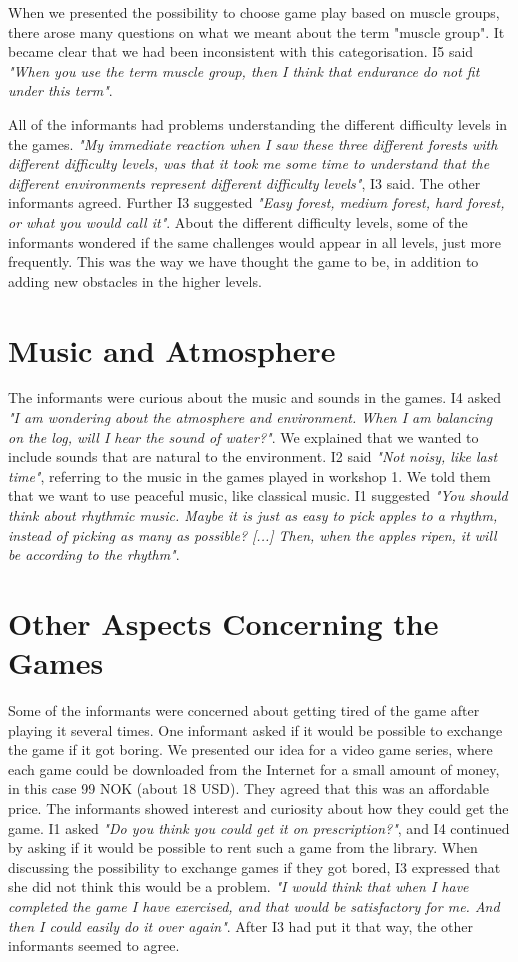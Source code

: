 When we presented the possibility to choose game play based on muscle groups, there arose many questions on what we meant about the term "muscle group". It became clear that we had been inconsistent with this categorisation. I5 said \emph{"When you use the term muscle group, then I think that endurance do not fit under this term"}.   

All of the informants had problems understanding the different difficulty levels in the games. \emph{"My immediate reaction when I saw these three different forests with different difficulty levels, was that it took me some time to understand that the different environments represent different difficulty levels"}, I3 said. The other informants agreed. Further I3 suggested \emph{"Easy forest, medium forest, hard forest, or what you would call it"}. About the different difficulty levels, some of the informants wondered if the same challenges would appear in all levels, just more frequently. This was the way we have thought the game to be, in addition to adding new obstacles in the higher levels.

\section{Music and Atmosphere}

The informants were curious about the music and sounds in the games. I4 asked \emph{"I am wondering about the atmosphere and environment. When I am balancing on the log, will I hear the sound of water?"}. We explained that we wanted to include sounds that are natural to the environment. I2 said \emph{"Not noisy, like last time"}, referring to the music in the games played in workshop 1. We told them that we want to use peaceful music, like classical music. I1 suggested \emph{"You should think about rhythmic music. Maybe it is just as easy to pick apples to a rhythm, instead of picking as many as possible? [...] Then, when the apples ripen, it will be according to the rhythm"}. 


\section{Other Aspects Concerning the Games}

Some of the informants were concerned about getting tired of the game after playing it several times. One informant asked if it would be possible to exchange the game if it got boring. We presented our idea for a video game series, where each game could be downloaded from the Internet for a small amount of money, in this case 99 NOK (about 18 USD). They agreed that this was an affordable price. The informants showed interest and curiosity about how they could get the game. I1 asked \emph{"Do you think you could get it on prescription?"}, and I4 continued by asking if it would be possible to rent such a game from the library. When discussing the possibility to exchange games if they got bored, I3 expressed that she did not think this would be a problem. \emph{"I would think that when I have completed the game I have exercised, and that would be satisfactory for me. And then I could easily do it over again"}. After I3 had put it that way, the other informants seemed to agree.

